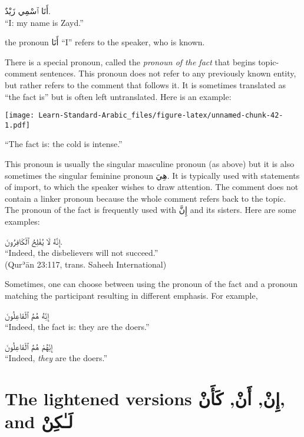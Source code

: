 \documentclass[
  10pt,
]{book}
\begin{document}
\foreignlanguage{arabic}{أَنَا ٱسْمِي زَيْدٌ.}\\
\enquote{I: my name is Zayd.}

the pronoun \foreignlanguage{arabic}{أَنَا} \enquote{I} refers to the speaker, who is known.

There is a special pronoun, called the \emph{pronoun of the fact} that begins topic-comment sentences. This pronoun does not refer to any previously known entity, but rather refers to the comment that follows it. It is sometimes translated as \enquote{the fact is} but is often left untranslated. Here is an example:

\texttt{[image: Learn-Standard-Arabic\_files/figure-latex/unnamed-chunk-42-1.pdf]}

\enquote{The fact is: the cold is intense.}

This pronoun is usually the singular masculine pronoun (as above) but it is also sometimes the singular feminine pronoun \foreignlanguage{arabic}{هِيَ}.
It is typically used with statements of import, to which the speaker wishes to draw attention.
The comment does not contain a linker pronoun because the whole comment refers back to the topic.
The pronoun of the fact is frequently used with \foreignlanguage{arabic}{إِنَّ} and its sisters.
Here are some examples:

\foreignlanguage{arabic}{إِنَّهُ لَا يُفْلِحُ ٱلْکَافِرُونَ.}\\
\enquote{Indeed, the disbelievers will not succeed.}\\
(Qurʾān 23:117, trans. Saheeh International)

Sometimes, one can choose between using the pronoun of the fact and a pronoun matching the participant resulting in different emphasis. For example,

\foreignlanguage{arabic}{إِنِّهُ هُمُ ٱلْفَاعِلُونَ}\\
\enquote{Indeed, the fact is: they are the doers.}

\foreignlanguage{arabic}{إِنِّهُمْ هُمُ ٱلْفَاعِلُونَ}\\
\enquote{Indeed, \emph{they} are the doers.}

\section{\texorpdfstring{The lightened versions \foreignlanguage{arabic}{إِنْ}, \foreignlanguage{arabic}{أَنْ}, \foreignlanguage{arabic}{کَأَنْ}, and \foreignlanguage{arabic}{لَـٰکِنْ}}{The lightened versions إِنْ, أَنْ, کَأَنْ, and لَـٰکِنْ}}\label{the-lightened-versions-ux625ux646-ux623ux646-ux643ux623ux646-and-ux644ux640ux643ux646}
\end{document}
